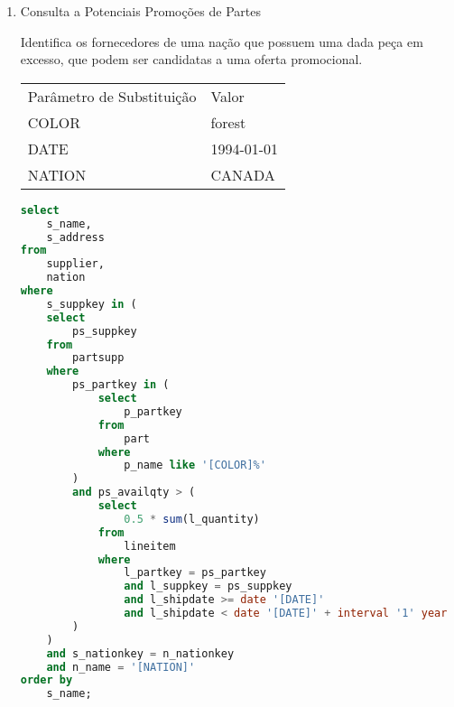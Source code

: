 \begin{enumerate}
	\begin{lstlisting}[language=SQL]
select
	sum(l_extendedprice* (1 - l_discount)) as revenue
from
	lineitem,
	part
where
	(
		p_partkey = l_partkey
		and p_brand = '[BRAND1]'
		and p_container in ('SM CASE', 'SM BOX', 'SM PACK', 'SM PKG')
		and l_quantity >= [QUANTITY1] and l_quantity <= [QUANTITY1] + 10
		and p_size between 1 and 5
		and l_shipmode in ('AIR', 'AIR REG')
		and l_shipinstruct = 'DELIVER IN PERSON'
	)
	or
	(
		p_partkey = l_partkey
		and p_brand = '[BRAND2]'
		and p_container in ('MED BAG', 'MED BOX', 'MED PKG', 'MED PACK')
		and l_quantity >= [QUANTITY2] and l_quantity <= [QUANTITY2] + 10
		and p_size between 1 and 10
		and l_shipmode in ('AIR', 'AIR REG')
		and l_shipinstruct = 'DELIVER IN PERSON'
	)
	or
	(
		p_partkey = l_partkey
		and p_brand = '[BRAND3]'
		and p_container in ('LG CASE', 'LG BOX', 'LG PACK', 'LG PKG')
		and l_quantity >= [QUANTITY3] and l_quantity <= [QUANTITY3] + 10
		and p_size between 1 and 15
		and l_shipmode in ('AIR', 'AIR REG')
		and l_shipinstruct = 'DELIVER IN PERSON'
	);
	
	\end{lstlisting}

\item Consulta a Potenciais Promoções de Partes

Identifica os fornecedores de uma nação que possuem uma dada peça em excesso, que podem ser candidatas a uma oferta promocional.

\begin{tabular}{ll}
	Parâmetro de Substituição & Valor\\
	COLOR & forest\\
	DATE & 1994-01-01\\
	NATION & CANADA\\
\end{tabular}

	\begin{lstlisting}[language=SQL]
select
	s_name,
	s_address
from
	supplier,
	nation
where
	s_suppkey in (
	select
		ps_suppkey
	from
		partsupp
	where
		ps_partkey in (
			select
				p_partkey
			from
				part
			where
				p_name like '[COLOR]%'
		)
		and ps_availqty > (
			select
				0.5 * sum(l_quantity)
			from
				lineitem
			where
				l_partkey = ps_partkey
				and l_suppkey = ps_suppkey
				and l_shipdate >= date '[DATE]'
				and l_shipdate < date '[DATE]' + interval '1' year
		)
	)
	and s_nationkey = n_nationkey
	and n_name = '[NATION]'
order by
	s_name;
	

\end{lstlisting}
\end{enumerate}
